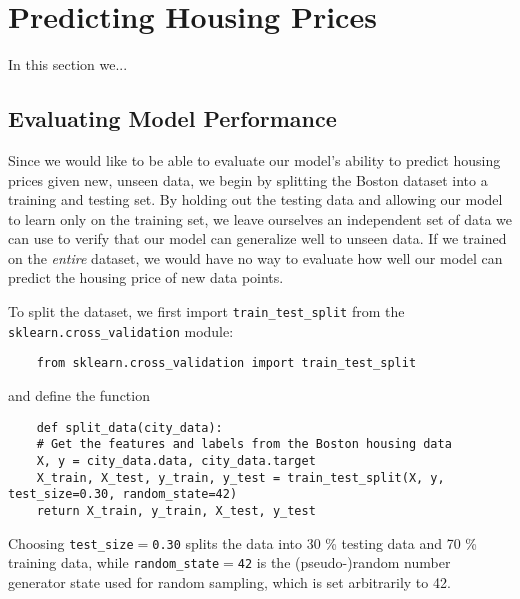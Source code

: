 \documentclass[12 pt]{article}
\numberwithin{equation}{section}
\begin{document}
\section{Predicting Housing Prices}
In this section we...
\subsection{Evaluating Model Performance}
Since we would like to be able to evaluate our model's ability to predict housing prices given new, unseen data, we begin by splitting the Boston dataset into a training and testing set. By holding out the testing data and allowing our model to learn only on the training set, we leave ourselves an independent set of data we can use to verify that our model can generalize well to unseen data. If we trained on the \emph{entire} dataset, we would have no way to evaluate how well our model can predict the housing price of new data points.

To split the dataset, we first import \texttt{train\_test\_split} from the \texttt{sklearn.cross\_validation} module:
\begin{verbatim}
	from sklearn.cross_validation import train_test_split
\end{verbatim}
and define the function 
\begin{verbatim}
	def split_data(city_data):
    # Get the features and labels from the Boston housing data
    X, y = city_data.data, city_data.target
    X_train, X_test, y_train, y_test = train_test_split(X, y, test_size=0.30, random_state=42)
    return X_train, y_train, X_test, y_test
\end{verbatim}
Choosing \texttt{test\_size$=$0.30} splits the data into 30 \% testing data and 70 \% training data, while \texttt{random\_state$=$42} is the (pseudo-)random number generator state used for random sampling, which is set arbitrarily to 42.
\end{document}
